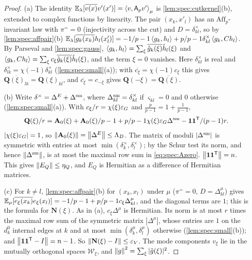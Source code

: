 \begin{proof}
(a) The identity $\mathbb E_\lambda[\overline{v(x)}v'(x')]=\left\langle v,\mathsf A_p v'\right\rangle_\mu$ is
\cref{lem:spec:cutkernel}(b), extended to complex functions by linearity. The
pair $(x_k,x'_l)$ has an $\mathrm{Aff}_p$-invariant law with $\pi^==0$
(injectivity across the cut) and $D=\delta^\times_{kl}$, so by
\cref{lem:spec:affpair}(b)
$\mathbb E_\lambda[\overline{g_k(x_k)}h_l(x'_l)]=-1/p-1\left\langle g_k,h_l\right\rangle+p/p-1\delta^\times_{kl}
\left\langle g_k,Ch_l\right\rangle$. By Parseval and \cref{lem:spec:gauss},
$\left\langle g_k,h_l\right\rangle=\sum_\xi\overline{\hat g_k(\xi)}\hat h_l(\xi)$ and
$\left\langle g_k,Ch_l\right\rangle=\sum_\xi c_\xi\overline{\hat g_k(\xi)}\hat h_l(\xi)$, and the term $\xi=0$
vanishes. Here $\delta^\times_{kl}$ is real and $\delta^\times_{lk}=\chi(-1)\delta^\times_{kl}$
(\cref{lem:spec:small}(a)); with $\overline{c_\xi}=\chi(-1)c_\xi$ this gives
$\overline{\mathbf Q(\xi)_{lk}}=\mathbf Q(\xi)_{kl}$, and $\overline{c_\xi}=c_{-\xi}$ gives
$\mathbf Q(-\xi)=\overline{\mathbf Q(\xi)}$.

(b) Write $\delta^\times=\Delta^E+\Delta^{\rm sm}$, where $\Delta^{\rm sm}_{kl}=\delta^\times_{kl}$ if
$\varsigma_{kl}=0$ and $0$ otherwise (\cref{lem:spec:small}(a)). With
$c_\xi/r=\chi(\xi)\varepsilon_G$ and $\frac p{p-1}=1+\frac1{p-1}$,
\[
  \mathbf Q(\xi)/r=\mathbf A_{0}(\xi)+\mathbf A_{0}(\xi)/p-1+p/p-1\chi(\xi)\varepsilon_G\Delta^{\rm sm}
  -\mathbf 1\mathbf 1^{\mathsf T}/(p-1)r.
\]
$|\chi(\xi)\varepsilon_G|=1$, so $\left\|\mathbf A_{0}(\xi)\right\|=\left\|\Delta^E\right\|\le\Lambda_D$. The matrix of
moduli $|\Delta^{\rm sm}|$ is symmetric with entries at most
$\min(\delta^\times_k,\delta^\times_l)$; by the Schur test its norm, and hence
$\left\|\Delta^{\rm sm}\right\|$, is at most the maximal row sum in \eqref{eq:spec:Azero}.
$\left\|\mathbf 1\mathbf 1^{\mathsf T}\right\|=n$. This gives $\left\|E_Q\right\|\le\eta_Q$, and $E_Q$ is
Hermitian as a difference of Hermitian matrices.

(c) For $k\ne l$, \cref{lem:spec:affpair}(b) for $(x_k,x_l)$ under $\mu$
($\pi^==0$, $D=\Delta^\mu_{kl}$) gives
$\mathbb E_\mu[\overline{e_\xi(x_k)}e_\xi(x_l)]=-1/p-1+p/p-1c_\xi\Delta^\mu_{kl}$,
and the diagonal terms are $1$; this is the formula for $\mathbf N(\xi)$. As in
(a), $c_\xi\Delta^\mu$ is Hermitian. Its norm is at most $r$ times the maximal row
sum of the symmetric matrix $|\Delta^\mu|$, whose entries are $1$ on the $d^0_k$
internal edges at $k$ and at most $\min(\delta^\mu_k,\delta^\mu_l)$ otherwise
(\cref{lem:spec:small}(b)); and $\left\|\mathbf 1\mathbf 1^{\mathsf T}-I\right\|=n-1$. So
$\left\|\mathbf N(\xi)-I\right\|\le\varepsilon_V$. The mode components $v_\xi$ lie in the mutually
orthogonal spaces $\mathcal W_\xi$, and $\left\|g\right\|^2=\sum_\xi|\hat g(\xi)|^2$.
\end{proof}

